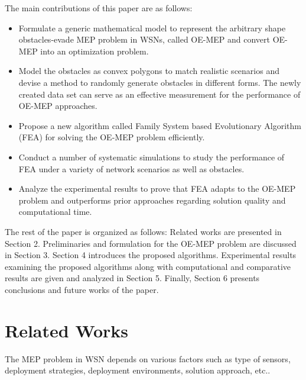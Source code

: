 \documentclass[final]{elsarticle}
\begin{document}
The main contributions of this paper are as follows:
\begin{itemize}
	\itemsep0em
	\item Formulate a generic mathematical model to represent the arbitrary shape obstacles-evade MEP problem in WSNs, called OE-MEP and convert OE-MEP into an optimization problem.
	\item Model the obstacles as convex polygons to match realistic scenarios and devise a method to randomly generate obstacles in different forms. The newly created data set can serve as an effective measurement for the performance of OE-MEP approaches.  
	\item Propose a new algorithm called Family System based Evolutionary Algorithm (FEA) for solving the OE-MEP problem efficiently. 
	\item Conduct a number of systematic simulations to study the performance of FEA under a variety of network scenarios as well as obstacles.
	\item Analyze the experimental results to prove that FEA adapts to the OE-MEP problem and outperforms prior approaches regarding solution quality and computational time.	
\end{itemize}
The rest of the paper is organized as follows: Related works are presented in Section 2. Preliminaries and formulation for the OE-MEP problem are discussed in
Section 3. Section 4 introduces the proposed algorithms. Experimental results
examining the proposed algorithms along with computational and comparative
results are given and analyzed in Section 5. Finally, Section 6 presents conclusions and future works of the paper.
\section{Related Works}
The MEP problem in WSN depends on various factors such as type of sensors, deployment strategies, deployment environments, solution approach, etc..
\end{document}
